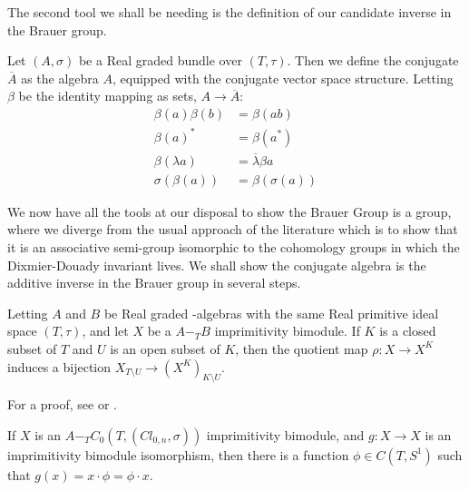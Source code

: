 The second tool we shall be needing is the definition of our candidate inverse in the Brauer group.
\begin{definition}
	Let $(A,\sigma)$ be a Real graded \Cstar bundle over $(T,\tau)$. Then we define the conjugate $\overline{A}$ as the algebra $A$, equipped with the conjugate vector space structure. Letting $\beta$ be the identity mapping as sets, $A\to \overline{A}$:
	\begin{align*}
		\beta(a)\beta(b)&=\beta(ab) \\
		\beta(a)^*&=\beta(a^*) \\
		\beta(\lambda a)&=\overline{\lambda} \beta{a} \\
		\sigma(\beta(a))&=\beta(\sigma(a))
	\end{align*}
\end{definition}
We now have all the tools at our disposal to show the Brauer Group is a group, where we diverge from the usual approach of the literature which is to show that it is an associative semi-group isomorphic to the cohomology groups in which the Dixmier-Douady invariant lives. 
We shall show the conjugate algebra is the additive inverse in the Brauer group in several steps. 
\begin{proposition}\label{pic16}
	Letting $A$ and $B$ be Real graded \Cstar-algebras with the same Real primitive ideal space $(T,\tau)$, and let $X$ be a $A-_T B$ imprimitivity bimodule. If $K$ is a closed subset of $T$ and $U$ is an open subset of $K$, then the quotient map $\rho:X\to X^K$ induces a bijection $X_{T\setminus U} \to (X^K)_{K\setminus U}$.
\end{proposition}
For a proof, see \cite[Proposition 1.5, Corollary 1.6]{picard} or \cite[Lemma 5.34]{raeburncont}.
\begin{lemma}\label{lemmacocycle}
	If $X$ is an $A-_TC_0(T,(Cl_{0,n},\sigma))$ imprimitivity bimodule, and $g:X\to X$ is an imprimitivity  bimodule isomorphism, then there is a function $\phi \in C(T,S^1)$ such that $g(x)=x\cdot \phi=\phi \cdot x$. 
\end{lemma}

